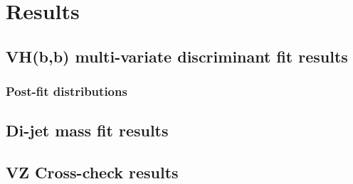 \chapter{Results}%
\label{ch:results}
\section{VH(b,b) multi-variate discriminant fit results}%
\label{sec:mva-results}
\subsection{Post-fit distributions}






\section{Di-jet mass fit results}%
\label{sec:mbb-results}
\section{VZ Cross-check results}%
\label{sec:VZ-results}

